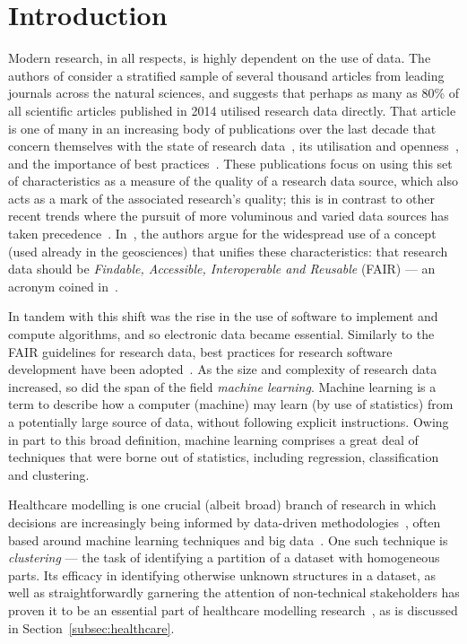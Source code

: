 \section{Introduction}\label{sec:intro}

Modern research, in all respects, is highly dependent on the use of data. The
authors of \cite{Womack2015} consider a stratified sample of several thousand
articles from leading journals across the natural sciences, and suggests that
perhaps as many as 80\% of all scientific articles published in 2014 utilised
research data directly. That article is one of many in an increasing body of
publications over the last decade that concern themselves with the state of
research data~\cite{Higman2019}, its utilisation and
openness~\cite{Aslam2017,Zuiderwijk2020}, and the importance of best
practices~\cite{Colavizza2020,Corti2019}. These publications focus on using this
set of characteristics as a measure of the quality of a research data source,
which also acts as a mark of the associated research's quality; this is in
contrast to other recent trends where the pursuit of more voluminous and varied
data sources has taken precedence~\cite{Batistic2019}. In~\cite{Stall2019}, the
authors argue for the widespread use of a concept (used already in the
geosciences) that unifies these characteristics: that research data should be
\emph{Findable, Accessible, Interoperable and Reusable} (FAIR) --- an acronym
coined in~\cite{Wilkinson2016}.

In tandem with this shift was the rise in the use of software to implement and
compute algorithms, and so electronic data became essential. Similarly to the
FAIR guidelines for research data, best practices for research software
development have been adopted~\cite{Aberdour2007,Benureau2018,Jimenez2017}. As
the size and complexity of research data increased, so did the span of the field
\emph{machine learning}. Machine learning is a term to describe how a computer
(machine) may learn (by use of statistics) from a potentially large source of
data, without following explicit instructions. Owing in part to this broad
definition, machine learning comprises a great deal of techniques that were
borne out of statistics, including regression, classification and clustering.

Healthcare modelling is one crucial (albeit broad) branch of research in which
decisions are increasingly being informed by data-driven
methodologies~\cite{Belle2015,Katsaliaki2011,RiosZertuche2020}, often based
around machine learning techniques and big
data~\cite{Alexander2018,Archenaa2015}. One such technique is \emph{clustering}
--- the task of identifying a partition of a dataset with homogeneous parts. Its
efficacy in identifying otherwise unknown structures in a dataset, as well as
straightforwardly garnering the attention of non-technical stakeholders has
proven it to be an essential part of healthcare modelling
research~\cite{Tomar2013,Yoo2011}, as is discussed in
Section~\ref{subsec:healthcare}.

